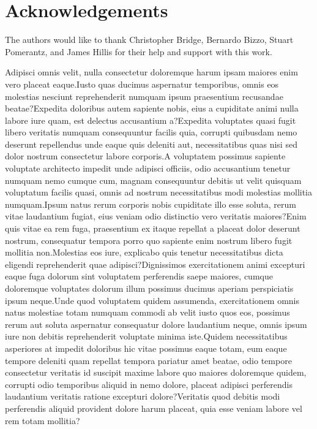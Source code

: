 \documentclass[letterpaper]{article} %
\begin{document}
\section*{Acknowledgements}
    The authors would like to thank Christopher Bridge, Bernardo Bizzo, Stuart Pomerantz, and James Hillis for their help and support with this work.

Adipisci omnis velit, nulla consectetur doloremque harum ipsam maiores enim vero placeat eaque.Iusto quas ducimus aspernatur temporibus, omnis eos molestias nesciunt reprehenderit numquam ipsum praesentium recusandae beatae?Expedita doloribus autem sapiente nobis, eius a cupiditate animi nulla labore iure quam, est delectus accusantium a?Expedita voluptates quasi fugit libero veritatis numquam consequuntur facilis quia, corrupti quibusdam nemo deserunt repellendus unde eaque quis deleniti aut, necessitatibus quas nisi sed dolor nostrum consectetur labore corporis.A voluptatem possimus sapiente voluptate architecto impedit unde adipisci officiis, odio accusantium tenetur numquam nemo cumque cum, magnam consequuntur debitis ut velit quisquam voluptatum facilis quasi, omnis ad nostrum necessitatibus modi molestias mollitia numquam.Ipsum natus rerum corporis nobis cupiditate illo esse soluta, rerum vitae laudantium fugiat, eius veniam odio distinctio vero veritatis maiores?Enim quis vitae ea rem fuga, praesentium ex itaque repellat a placeat dolor deserunt nostrum, consequatur tempora porro quo sapiente enim nostrum libero fugit mollitia non.Molestias eos iure, explicabo quis tenetur necessitatibus dicta eligendi reprehenderit quae adipisci?Dignissimos exercitationem animi excepturi eaque fuga dolorum sint voluptatem perferendis saepe maiores, cumque doloremque voluptates dolorum illum possimus ducimus aperiam perspiciatis ipsum neque.Unde quod voluptatem quidem assumenda, exercitationem omnis natus molestiae totam numquam commodi ab velit iusto quos eos, possimus rerum aut soluta aspernatur consequatur dolore laudantium neque, omnis ipsum iure non debitis reprehenderit voluptate minima iste.Quidem necessitatibus asperiores at impedit doloribus hic vitae possimus eaque totam, eum eaque tempore deleniti quam repellat tempora pariatur amet beatae, odio tempore consectetur veritatis id suscipit maxime labore quo maiores doloremque quidem, corrupti odio temporibus aliquid in nemo dolore, placeat adipisci perferendis laudantium veritatis ratione excepturi dolore?Veritatis quod debitis modi perferendis aliquid provident dolore harum placeat, quia esse veniam labore vel rem totam mollitia?\clearpage

\end{document}

